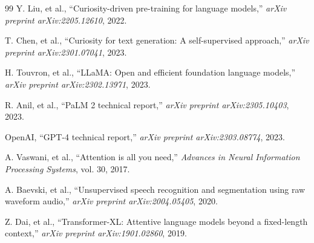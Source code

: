 \documentclass{IEEEtran}
\begin{document}
\begin{thebibliography}{99}
Y. Liu, et al., ``Curiosity-driven pre-training for language models,'' \textit{arXiv preprint arXiv:2205.12610}, 2022.

T. Chen, et al., ``Curiosity for text generation: A self-supervised approach,'' \textit{arXiv preprint arXiv:2301.07041}, 2023.

H. Touvron, et al., ``LLaMA: Open and efficient foundation language models,'' \textit{arXiv preprint arXiv:2302.13971}, 2023.

R. Anil, et al., ``PaLM 2 technical report,'' \textit{arXiv preprint arXiv:2305.10403}, 2023.

OpenAI, ``GPT-4 technical report,'' \textit{arXiv preprint arXiv:2303.08774}, 2023.

A. Vaswani, et al., ``Attention is all you need,'' \textit{Advances in Neural Information Processing Systems}, vol. 30, 2017.

A. Baevski, et al., ``Unsupervised speech recognition and segmentation using raw waveform audio,'' \textit{arXiv preprint arXiv:2004.05405}, 2020.

Z. Dai, et al., ``Transformer-XL: Attentive language models beyond a fixed-length context,'' \textit{arXiv preprint arXiv:1901.02860}, 2019.

\end{thebibliography}
\end{document}
